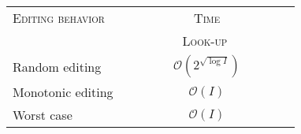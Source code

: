 
\begin{tabularx}{0.6\textwidth}{@{}Xc@{}}
  \toprule
  \textsc{Editing behavior} & \textsc{Time} \\
  & \ \ \ \ \ \ \ \ \ \textsc{Look-up} \ \ \ \ \ \ \ \ \ \\ \midrule
  Random editing & $\mathcal{O}(2^{\sqrt{\log I}})$ \\
  Monotonic editing & $\mathcal{O}(I)$ \\
  Worst case & $\mathcal{O}(I)$ \\ \bottomrule
\end{tabularx}

